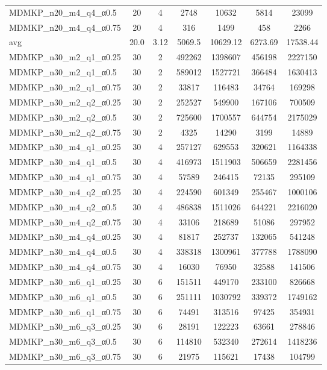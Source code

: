 \begin{table}[!ht]
\begin{tabular}{lcccccc}
MDMKP\_n20\_m4\_q4\_α0.5 & 20 & 4 & 2748 & 10632 & 5814 & 23099 \\
MDMKP\_n20\_m4\_q4\_α0.75 & 20 & 4 & 316 & 1499 & 458 & 2266 \\
\cline{1-9} avg & 20.0 & 3.12 & 5069.5& 10629.12 & 6273.69& 17538.44\\ \hline
MDMKP\_n30\_m2\_q1\_α0.25 & 30 & 2 & 492262 & 1398607 & 456198 & 2227150 \\
MDMKP\_n30\_m2\_q1\_α0.5 & 30 & 2 & 589012 & 1527721 & 366484 & 1630413 \\
MDMKP\_n30\_m2\_q1\_α0.75 & 30 & 2 & 33817 & 116483 & 34764 & 169298 \\
MDMKP\_n30\_m2\_q2\_α0.25 & 30 & 2 & 252527 & 549900 & 167106 & 700509 \\
MDMKP\_n30\_m2\_q2\_α0.5 & 30 & 2 & 725600 & 1700557 & 644754 & 2175029 \\
MDMKP\_n30\_m2\_q2\_α0.75 & 30 & 2 & 4325 & 14290 & 3199 & 14889 \\
MDMKP\_n30\_m4\_q1\_α0.25 & 30 & 4 & 257127 & 629553 & 320621 & 1164338 \\
MDMKP\_n30\_m4\_q1\_α0.5 & 30 & 4 & 416973 & 1511903 & 506659 & 2281456 \\
MDMKP\_n30\_m4\_q1\_α0.75 & 30 & 4 & 57589 & 246415 & 72135 & 295109 \\
MDMKP\_n30\_m4\_q2\_α0.25 & 30 & 4 & 224590 & 601349 & 255467 & 1000106 \\
MDMKP\_n30\_m4\_q2\_α0.5 & 30 & 4 & 486838 & 1511026 & 644221 & 2216020 \\
MDMKP\_n30\_m4\_q2\_α0.75 & 30 & 4 & 33106 & 218689 & 51086 & 297952 \\
MDMKP\_n30\_m4\_q4\_α0.25 & 30 & 4 & 81817 & 252737 & 132065 & 541248 \\
MDMKP\_n30\_m4\_q4\_α0.5 & 30 & 4 & 338318 & 1300961 & 377788 & 1788090 \\
MDMKP\_n30\_m4\_q4\_α0.75 & 30 & 4 & 16030 & 76950 & 32588 & 141506 \\
MDMKP\_n30\_m6\_q1\_α0.25 & 30 & 6 & 151511 & 449170 & 233100 & 826668 \\
MDMKP\_n30\_m6\_q1\_α0.5 & 30 & 6 & 251111 & 1030792 & 339372 & 1749162 \\
MDMKP\_n30\_m6\_q1\_α0.75 & 30 & 6 & 74491 & 313516 & 97425 & 354931 \\
MDMKP\_n30\_m6\_q3\_α0.25 & 30 & 6 & 28191 & 122223 & 63661 & 278846 \\
MDMKP\_n30\_m6\_q3\_α0.5 & 30 & 6 & 114810 & 532340 & 272614 & 1418236 \\
MDMKP\_n30\_m6\_q3\_α0.75 & 30 & 6 & 21975 & 115621 & 17438 & 104799 \\

\end{tabular}
\end{table}
